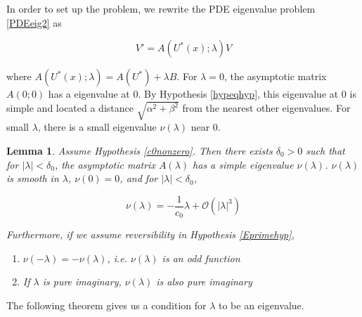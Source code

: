 \documentclass[12pt]{article}
\newtheorem{lemma}{Lemma}
\begin{document}
In order to set up the problem, we rewrite the PDE eigenvalue problem \eqref{PDEeig2} as

\begin{equation}\label{PDEeig3}
V' = A(U^*(x); \lambda)V 
\end{equation} 

where $A(U^*(x); \lambda) = A(U^*) + \lambda B$. For $\lambda = 0$, the asymptotic matrix $A(0; 0)$ has a eigenvalue at 0. By Hypothesis \ref{hypeqhyp}, this eigenvalue at 0 is simple and located a distance $\sqrt{\alpha^2 + \beta^2}$ from the nearest other eigenvalues. For small $\lambda$, there is a small eigenvalue $\nu(\lambda)$ near 0.


\begin{lemma}\label{nulambdalemma}
Assume Hypothesis \ref{c0nonzero}. Then there exists $\delta_0 > 0$ such that for $|\lambda| < \delta_0$, the asymptotic matrix $A(\lambda)$ has a simple eigenvalue $\nu(\lambda)$. $\nu(\lambda)$ is smooth in $\lambda$, $\nu(0) = 0$, and for $|\lambda| < \delta_0$,

\begin{equation}\label{nulambda}
\nu(\lambda) = -\frac{1}{c_0} \lambda + \mathcal{O}(|\lambda|^3)
\end{equation}

Furthermore, if we assume reversibility in Hypothesis \ref{Eprimehyp},

\begin{enumerate}
\item $\nu(-\lambda) = -\nu(\lambda)$, i.e. $\nu(\lambda)$ is an odd function 
\item If $\lambda$ is pure imaginary, $\nu(\lambda)$ is also pure imaginary
\end{enumerate}

\end{lemma}

The following theorem gives us a condition for $\lambda$ to be an eigenvalue.

\end{document}
